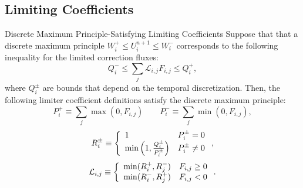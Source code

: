 \subsection{Limiting Coefficients}\label{L}
\begin{theorem}{Discrete Maximum Principle-Satisfying Limiting Coefficients}
   Suppose that that a discrete maximum principle $W_i^+\le U_i^{n+1}\le W_i^-$
   corresponds to the following inequality for the limited correction fluxes:
   \begin{equation}
      Q_i^-\le\sum\limits_j \mathcal{L}_{i,j}F_{i,j}\le Q_i^+,
   \end{equation}
   where $Q_i^\pm$ are bounds that depend on the temporal discretization. Then,
   the following limiter coefficient definitions satisfy the discrete maximum
   principle:
   \begin{equation}\label{P_defs}
      P_i^+ \equiv \sum\limits_j\max(0,F_{i,j}) \qquad
      P_i^- \equiv \sum\limits_j\min(0,F_{i,j}),
   \end{equation}
   \begin{equation}\label{R_defs}
      R_i^\pm \equiv\left\{
         \begin{array}{l l}
            1                                          & P_i^\pm = 0\\
            \min\left(1,\frac{Q_i^\pm}{P_i^\pm}\right) & P_i^\pm \ne 0
         \end{array}
         \right.,
   \end{equation}
   \begin{equation}\label{L_defs}
      \mathcal{L}_{i,j} \equiv\left\{
         \begin{array}{l l}
            \min(R_i^+,R_j^-) & F_{i,j} \geq 0\\
            \min(R_i^-,R_j^+) & F_{i,j} < 0
         \end{array}
         \right..
   \end{equation}  
\end{theorem}

